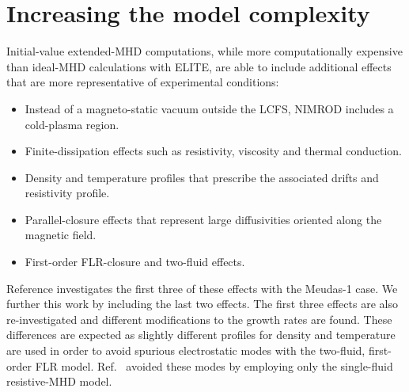 \section{Increasing the model complexity}
\label{sec:xMHD}


Initial-value extended-MHD computations, while more computationally expensive
than ideal-MHD calculations with ELITE, are able to include additional effects
that are more representative of experimental conditions:
\begin{itemize} \cramplist \zapspace
\item 
Instead of a magneto-static vacuum outside the LCFS, NIMROD includes a
cold-plasma region.
\item
Finite-dissipation effects such as resistivity, viscosity and thermal
conduction.
\item 
Density and temperature profiles that prescribe the associated
drifts and resistivity profile.
\item
Parallel-closure effects that represent large diffusivities oriented along the
magnetic field.
\item
First-order FLR-closure and two-fluid effects.
\end{itemize} 
Reference \cite{Ferraro10} investigates the first three of these effects with
the Meudas-1 case. We further this work by including the last two effects.  The
first three effects are also re-investigated and different modifications to the
growth rates are found. These differences are expected as slightly different
profiles for density and temperature are used in order to avoid spurious
electrostatic modes with the two-fluid, first-order FLR model. 
Ref.~\cite{Ferraro10} avoided these modes by employing only the
single-fluid resistive-MHD model.

